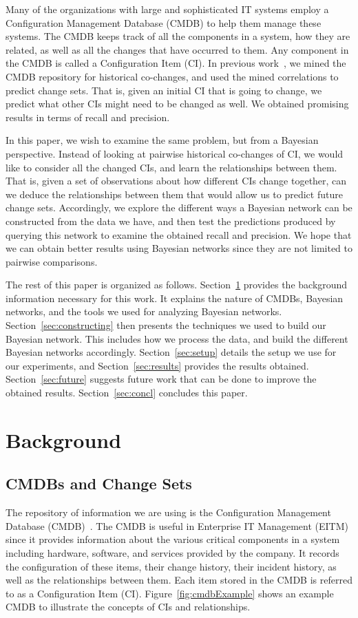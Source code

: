 \documentclass[10pt,twocolumn,letterpaper]{article}
\begin{document}
Many of the organizations with large and sophisticated IT systems employ a Configuration Management Database (CMDB) to help them manage these systems.
The CMDB keeps track of all the components in a system, how they are related, as well as all the changes that have occurred to them. Any component in the CMDB
is called a Configuration Item (CI). In previous work~\cite{nadi2010}, we mined the CMDB repository for historical co-changes, and used the mined correlations
to predict change sets. That is, given an initial CI that is going to change, we predict what other CIs might need to be changed as well. We obtained
promising results in terms of recall and precision. 

In this paper, we wish to examine the same problem, but from a Bayesian perspective. Instead of looking at pairwise historical co-changes of CI, we would like
to consider all the changed CIs, and learn the relationships between them. That is, given a set of observations about how different CIs change
together, can we deduce the relationships between them that would allow us to predict future change sets. Accordingly, we explore the different ways a Bayesian
network can be constructed from the data we have, and then test the predictions produced by querying this network to examine the obtained recall and precision.
We hope that we can obtain better results using Bayesian networks since they are not limited to pairwise comparisons. 

The rest of this paper is organized as follows. Section~\ref{sec:bg} provides the background information necessary for this work. It explains the nature of
CMDBs, Bayesian networks, and the tools we used for analyzing Bayesian networks. Section~\ref{sec:constructing} then presents the techniques we used to build
our Bayesian network. This includes how we process the data, and build the different Bayesian networks accordingly. Section~\ref{sec:setup} details the
setup we use for our experiments, and Section~\ref{sec:results} provides the results obtained. Section~\ref{sec:future} suggests future work that can be done
to improve the obtained results. Section~\ref{sec:concl} concludes this paper.


\section{Background}
\label{sec:bg}

\subsection{CMDBs and Change Sets}
The repository of information we are using is the Configuration Management Database (CMDB)~\cite{itil}. The CMDB is useful in Enterprise IT Management (EITM)
since it provides information about the various critical components in a system including hardware, software, and services provided by the company. It records
the configuration of these items, their change history, their incident history, as well as the relationships between them. Each item stored in the CMDB is
referred to as a Configuration Item (CI). Figure~\ref{fig:cmdbExample} shows an example CMDB to illustrate the concepts of CIs and relationships.
\end{document}
